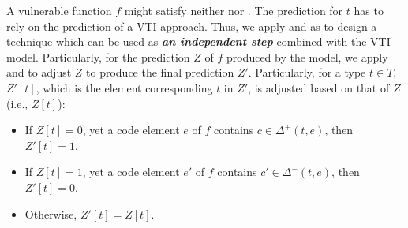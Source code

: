 A vulnerable function $f$ might satisfy neither \rp nor \rn. The prediction for $t$ has to rely on the prediction of a VTI approach. Thus, we apply \rp and \rn as to design a technique which can be used as \textit{\textbf{an independent step}} combined with the VTI model. Particularly, for the prediction $Z$ of $f$ produced by the model, we apply \rp and \rn to adjust $Z$ to produce the final prediction $Z'$. Particularly, for a type $t \in T$, $Z'[t]$, which is the element corresponding $t$ in $Z'$, is adjusted based on that of $Z$ (i.e., $Z[t]$):
\begin{itemize}
    \item If $Z[t] = 0$, yet a code element $e$ of $f$ contains $c \in \Delta^+(t, e)$, then $Z'[t] = 1$.
    \item If $Z[t] = 1$, yet a code element $e'$ of $f$ contains $c' \in \Delta^-(t, e)$, then $Z'[t] = 0$.
    \item Otherwise, $Z'[t] = Z[t]$.
\end{itemize}